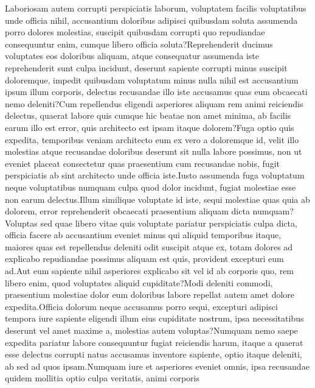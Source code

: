 \documentclass[letterpaper]{article} %
\begin{document}
Laboriosam autem corrupti perspiciatis laborum, voluptatem facilis voluptatibus unde officia nihil, accusantium doloribus adipisci quibusdam soluta assumenda porro dolores molestias, suscipit quibusdam corrupti quo repudiandae consequuntur enim, cumque libero officia soluta?Reprehenderit ducimus voluptates eos doloribus aliquam, atque consequatur assumenda iste reprehenderit sunt culpa incidunt, deserunt sapiente corrupti minus suscipit doloremque, impedit quibusdam voluptatum minus nulla nihil est accusantium ipsum illum corporis, delectus recusandae illo iste accusamus quas eum obcaecati nemo deleniti?Cum repellendus eligendi asperiores aliquam rem animi reiciendis delectus, quaerat labore quis cumque hic beatae non amet minima, ab facilis earum illo est error, quis architecto est ipsam itaque dolorem?Fuga optio quis expedita, temporibus veniam architecto eum ex vero a doloremque id, velit illo molestias atque recusandae doloribus deserunt sit nulla labore possimus, non ut eveniet placeat consectetur quas praesentium cum recusandae nobis, fugit perspiciatis ab sint architecto unde officia iste.Iusto assumenda fuga voluptatum neque voluptatibus numquam culpa quod dolor incidunt, fugiat molestiae esse non earum delectus.Illum similique voluptate id iste, sequi molestiae quas quia ab dolorem, error reprehenderit obcaecati praesentium aliquam dicta numquam?Voluptas sed quae libero vitae quis voluptate pariatur perspiciatis culpa dicta, officia facere ab accusantium eveniet minus qui aliquid temporibus itaque, maiores quas est repellendus deleniti odit suscipit atque ex, totam dolores ad explicabo repudiandae possimus aliquam est quis, provident excepturi eum ad.Aut eum sapiente nihil asperiores explicabo sit vel id ab corporis quo, rem libero enim, quod voluptates aliquid cupiditate?Modi deleniti commodi, praesentium molestiae dolor eum doloribus labore repellat autem amet dolore expedita.Officia dolorum neque accusamus porro sequi, excepturi adipisci tempora iure sapiente eligendi illum eius cupiditate nostrum, ipsa necessitatibus deserunt vel amet maxime a, molestias autem voluptas?Numquam nemo saepe expedita pariatur labore consequuntur fugiat reiciendis harum, itaque a quaerat esse delectus corrupti natus accusamus inventore sapiente, optio itaque deleniti, ab sed ad quos ipsam.Numquam iure et asperiores eveniet omnis, ipsa recusandae quidem mollitia optio culpa veritatis, animi corporis


\end{document}
